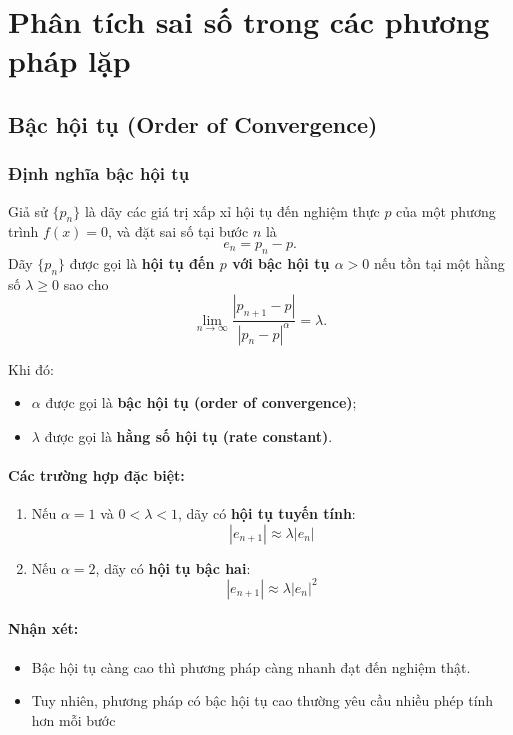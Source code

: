 \section{Phân tích sai số trong các phương pháp lặp}

\subsection{Bậc hội tụ (Order of Convergence)}
\subsubsection*{Định nghĩa bậc hội tụ}

Giả sử $\{p_n\}$ là dãy các giá trị xấp xỉ hội tụ đến nghiệm thực $p$ của một phương trình $f(x) = 0$, và đặt sai số tại bước $n$ là 
\[
e_n = p_n - p.
\]
Dãy $\{p_n\}$ được gọi là \textbf{hội tụ đến $p$ với bậc hội tụ $\alpha > 0$} nếu tồn tại một hằng số $\lambda \ge 0$ sao cho
\[
    \lim_{n \to \infty} 
    \frac{|p_{n+1} - p|}{|p_n - p|^{\alpha}} = \lambda.
\]

Khi đó:
\begin{itemize}
    \item $\alpha$ được gọi là \textbf{bậc hội tụ (order of convergence)};
    \item $\lambda$ được gọi là \textbf{hằng số hội tụ (rate constant)}.
\end{itemize}

\paragraph*{Các trường hợp đặc biệt:}
\begin{enumerate}
    \item Nếu $\alpha = 1$ và $0 < \lambda < 1$, dãy có \textbf{hội tụ tuyến tính}:
    \[
        |e_{n+1}| \approx \lambda |e_n|
    \]
    \item Nếu $\alpha = 2$, dãy có \textbf{hội tụ bậc hai}:
    \[
        |e_{n+1}| \approx \lambda |e_n|^2
    \]

\end{enumerate}

\paragraph*{Nhận xét:}
\begin{itemize}
    \item Bậc hội tụ càng cao thì phương pháp càng nhanh đạt đến nghiệm thật.
    \item Tuy nhiên, phương pháp có bậc hội tụ cao thường yêu cầu nhiều phép tính hơn mỗi bước 

\end{itemize}

